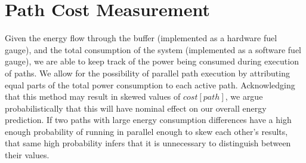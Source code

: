\documentclass{article}
\begin{document}
\rmfamily




\section{Path Cost Measurement}

Given the energy flow through the buffer (implemented as a hardware fuel gauge), and the total consumption of the system (implemented as a software fuel gauge), we are able to keep track of the power being consumed during execution of paths.  We allow for the possibility of parallel path execution by attributing equal parts of the total power consumption to each active path.  Acknowledging that this method may result in skewed values of ${cost}[{path}]$, we argue probabilistically that this will have nominal effect on our overall energy prediction.  If two paths with large energy consumption differences have a high enough probability of running in parallel enough to skew each other's results, that same high probability infers that it is unnecessary to distinguish between their values.
\end{document}
